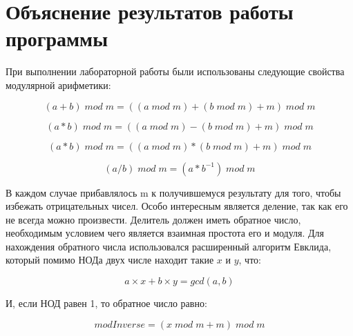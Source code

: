 \documentclass[a4paper, 12pt]{article}
\begin{document}
\newpage

\section{Объяснение результатов работы программы}

При выполнении лабораторной работы были использованы следующие свойства модулярной арифметики:

\[ (a + b)\;mod\;m = ((a\;mod\;m)+(b\;mod\;m) + m)\;mod\;m \]

\[ (a * b)\;mod\;m = ((a\;mod\;m)-(b\;mod\;m) + m)\;mod\;m \]

\[ (a * b)\;mod\;m = ((a\;mod\;m)*(b\;mod\;m) + m)\;mod\;m \]

\[ (a / b)\;mod\;m = (a*b^{-1})\;mod\;m \]

В каждом случае прибавлялось m к получившемуся результату для того, чтобы избежать отрицательных чисел. Особо интересным является деление, так как его не всегда можно произвести. Делитель должен иметь обратное число, необходимым условием чего является взаимная простота его и модуля. Для нахождения обратного числа использовался расширенный алгоритм Евклида, который помимо НОДа двух числе находит такие $ x $  и $ y $, что:

\[ a \times x + b\times y = gcd(a,b) \]

И, если НОД равен 1, то обратное число равно:

\[ modInverse = (x\;mod\;m + m)\;mod\;m \]
\end{document}
